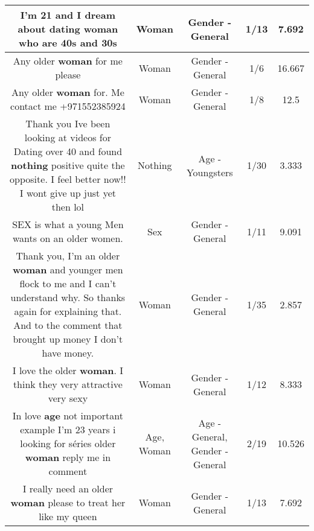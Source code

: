 \documentclass[11pt]{article}
\newlength\mylength
\begin{document}
\begin{center}
\begin{longtable}{|C{.65\mylength}|C{.30\mylength}|C{.12\mylength}|C{.12\mylength}|C{.12\mylength}|}
  \small I'm 21 and I dream about dating \textbf{woman} who are 40s and 30s\normalsize   & Woman & Gender - General & 1/13 & 7.692 \\  \hline
  \small Any older \textbf{woman} for me please\normalsize   & Woman & Gender - General & 1/6 & 16.667 \\  \hline
  \small Any older \textbf{woman} for. Me contact me +971552385924\normalsize   & Woman & Gender - General & 1/8 & 12.5 \\  \hline
  \small Thank you Ive been looking at videos for Dating over 40 and found \textbf{nothing} positive quite the opposite. I feel better now!! I wont give up just yet then lol\normalsize   & Nothing & Age - Youngsters & 1/30 & 3.333 \\  \hline
  \small SEX is what a young Men wants on an older women.\normalsize   & Sex & Gender - General & 1/11 & 9.091 \\  \hline
  \small Thank you, I'm an older \textbf{woman} and younger men flock to me and I  can't understand why. So thanks again for explaining that. And to the comment that brought up money I don't have money.\normalsize   & Woman & Gender - General & 1/35 & 2.857 \\  \hline
  \small I love the older \textbf{woman}. I think they very attractive very sexy\normalsize   & Woman & Gender - General & 1/12 & 8.333 \\  \hline
  \small In love \textbf{age} not important example I'm 23 years i looking for séries older \textbf{woman} reply me in comment\normalsize   & Age, Woman & Age - General, Gender - General & 2/19 & 10.526 \\  \hline
  \small I really need an older \textbf{woman} please to treat her like my queen\normalsize   & Woman & Gender - General & 1/13 & 7.692 \\  \hline

\end{longtable}
\end{center}
\end{document}
